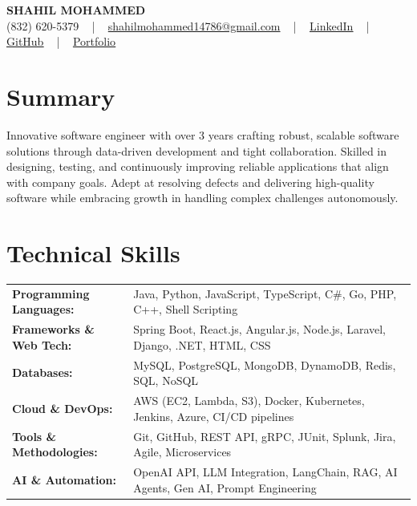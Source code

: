 \documentclass[letterpaper,11pt]{article}
\begin{document}
\begin{center}
    {\fontsize{14pt}{12pt}\selectfont \textbf{\MakeUppercase{Shahil Mohammed}}}\\ \vspace{2pt}
    \fontsize{10pt}{12pt}\selectfont (832) 620-5379 ~ | ~ \href{mailto:shahilmohammed14786@gmail.com}{shahilmohammed14786@gmail.com} ~ | ~  
    \href{https://www.linkedin.com/in/shahil-mohammed-9652931a1/}{\color{blue}\underline{LinkedIn}}  ~ | ~ 
    \href{https://github.com/freakbeast14}{\color{blue}\underline{GitHub}} ~ | ~ 
    \href{https://shahil-mohammed.netlify.app/}{\color{blue}\underline{Portfolio}}
    \vspace{-8pt}
\end{center}

\section{Summary}
\fontsize{9pt}{10pt}\selectfont
Innovative software engineer with over 3 years crafting robust, scalable software solutions through data-driven development and tight collaboration. Skilled in designing, testing, and continuously improving reliable applications that align with company goals. Adept at resolving defects and delivering high-quality software while embracing growth in handling complex challenges autonomously.
 \vspace{-5pt}
 
\section{Technical Skills}
        \vspace{-14pt}
        \begin{table}[h]
            \fontsize{9pt}{10pt}\selectfont
            \begin{tabular}{p{0.3\linewidth} p{0.7\linewidth}}
                \textbf{Programming Languages:} & Java, Python, JavaScript, TypeScript, C\#, Go, PHP, C++, Shell Scripting \\
                \textbf{Frameworks \& Web Tech:} & Spring Boot, React.js, Angular.js, Node.js, Laravel, Django, .NET, HTML, CSS \\
                \textbf{Databases:} & MySQL, PostgreSQL, MongoDB, DynamoDB, Redis, SQL, NoSQL \\
                \textbf{Cloud \& DevOps:} & AWS (EC2, Lambda, S3), Docker, Kubernetes, Jenkins, Azure, CI/CD pipelines \\
                \textbf{Tools \& Methodologies:} & Git, GitHub, REST API, gRPC, JUnit, Splunk, Jira, Agile, Microservices \\
                \textbf{AI \& Automation:} & OpenAI API, LLM Integration, LangChain, RAG, AI Agents, Gen AI, Prompt Engineering \\
            \end{tabular}
        \end{table}
 \vspace{-15pt}
 
\end{document}
